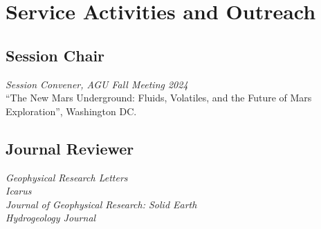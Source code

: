 \documentclass[11pt, letterpaper]{article}
\newcommand{\years}[1]{\marginnote{\scriptsize #1}}
\begin{document}
{{%

\section*{Service Activities and Outreach}

\hypersetup{linkcolor=black,citecolor=blue,filecolor=black,urlcolor=black}

\subsection*{Session Chair}\noindent

\years{2024} \textit{Session Convener, AGU Fall Meeting 2024}\\
``The New Mars Underground: Fluids, Volatiles, and the Future of Mars
Exploration'', Washington DC. 




\subsection*{Journal Reviewer}

    \textit{Geophysical Research Letters}\\
    \textit{Icarus}\\
    \textit{Journal of Geophysical Research: Solid Earth}\\
    \textit{Hydrogeology Journal}



}}
\end{document}
